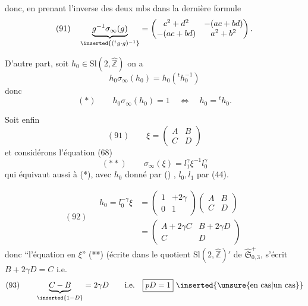 
donc, en prenant l'inverse des deux mbs dans
la dernière formule
\[
(91)\quad \underbrace{g^{-1}\sigma_\infty(g)}_{\inserted{({}^t g\cdot g)^{-1}}}
=\begin{pmatrix}c^2+d^2&-(ac+bd)\\-(ac+bd)&a^2+b^2\end{pmatrix}.
\]

D'autre part, soit
$h_0\in\mathrm{Sl}(2,\widehat{\mathbb Z})$
on a
\[
h_0\sigma_\infty(h_0)=h_0({}^t h_0^{-1})
\]
donc
\[
(*)\qquad h_0\sigma_\infty(h_0)=1\quad\Longleftrightarrow\quad h_0={}^t h_0.
\]

Soit enfin
\[
(91)\qquad \xi=\begin{pmatrix}A&B\\C&D\end{pmatrix}
\]
et considérons l'équation (68)
\[
(**)\qquad \sigma_\infty(\xi)=l_1^\gamma\xi^{-1}l_0^\gamma
\]
qui équivaut aussi à (*), avec $h_0$ donné par ()
, $l_0,l_1$ par (44).


\[
(92)\quad\begin{aligned}
h_0=l_0^{-\gamma}\xi
&=\begin{pmatrix}1&+2\gamma\\0&1\end{pmatrix}
\begin{pmatrix}A&B\\C&D\end{pmatrix}\\
&=\begin{pmatrix}A+2\gamma C&B+2\gamma D\\C&D\end{pmatrix}
\end{aligned}
\]
donc ``l'équation en $\xi$'' (**) (écrite dans le
quotient $\mathrm{Sl}(2,\widehat{\mathbb Z})'$ de $\widehat{\mathfrak S}_{0,3}^{+}$, s'écrit $B+2\gamma D=C$
i.e.
\[
(93)\qquad \underbrace{C-B}_{\inserted{1-D}}=2\gamma D
\qquad\text{i.e.}\quad\boxed{pD=1}\ \inserted{\text{\unsure{en cas|un cas}}}
\]

